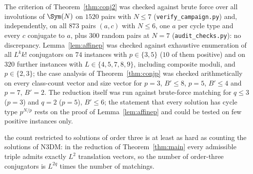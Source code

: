 \begin{thm}
\begin{defi}[\textsc{Order-3 Conjugacy}, $\Dzero$]
The criterion of Theorem~\ref{thm:conj2} was checked against brute force over all involutions of $\Sym(N)$ on $1520$ pairs with
$N\le7$ (\texttt{verify\_campaign.py}) and, independently, on all $873$ pairs $(a,c)$ with $N\le6$, one $a$ per cycle type and every $c$
conjugate to $a$, plus $300$ random pairs at $N=7$ (\texttt{audit\_checks.py}): no discrepancy.
Lemma~\ref{lem:affinep} was checked against exhaustive enumeration of all $L^{k}k!$ conjugators on $74$ instances with $p\in\{3,5\}$
($10$ of them positive) and on $320$ further instances with $L\in\{4,5,7,8,9\}$, including composite moduli, and $p\in\{2,3\}$; the
case analysis of Theorem~\ref{thm:conjp} was checked arithmetically on every class-count vector and size vector for $p=3$, $B'\le8$,
$p=5$, $B'\le4$ and $p=7$, $B'=2$. The reduction itself was run against brute-force matching for $q\le3$ ($p=3$) and $q=2$ ($p=5$),
$B'\le6$; the statement that every solution has cycle type $p^{N/p}$ rests on the proof of Lemma~\ref{lem:affinep} and could be tested on
few positive instances only.

the count restricted to solutions of order three is at least as hard as counting the solutions of N3DM: in the reduction of
Theorem~\ref{thm:main} every admissible triple admits exactly $L^{2}$ translation vectors, so the number of order-three conjugators is
$L^{2q}$ times the number of matchings.


\end{defi}
\end{thm}
